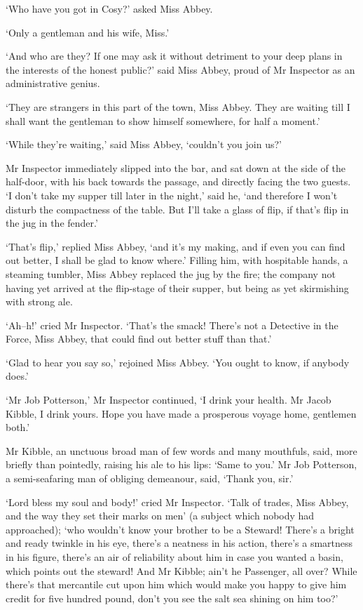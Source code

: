 ‘Who have you got in Cosy?’ asked Miss Abbey.

‘Only a gentleman and his wife, Miss.’

‘And who are they? If one may ask it without detriment to your deep
plans in the interests of the honest public?’ said Miss Abbey, proud of
Mr Inspector as an administrative genius.

‘They are strangers in this part of the town, Miss Abbey. They are
waiting till I shall want the gentleman to show himself somewhere, for
half a moment.’

‘While they’re waiting,’ said Miss Abbey, ‘couldn’t you join us?’

Mr Inspector immediately slipped into the bar, and sat down at the side
of the half-door, with his back towards the passage, and directly facing
the two guests. ‘I don’t take my supper till later in the night,’ said
he, ‘and therefore I won’t disturb the compactness of the table. But
I’ll take a glass of flip, if that’s flip in the jug in the fender.’

‘That’s flip,’ replied Miss Abbey, ‘and it’s my making, and if even you
can find out better, I shall be glad to know where.’ Filling him, with
hospitable hands, a steaming tumbler, Miss Abbey replaced the jug by
the fire; the company not having yet arrived at the flip-stage of their
supper, but being as yet skirmishing with strong ale.

‘Ah--h!’ cried Mr Inspector. ‘That’s the smack! There’s not a Detective
in the Force, Miss Abbey, that could find out better stuff than that.’

‘Glad to hear you say so,’ rejoined Miss Abbey. ‘You ought to know, if
anybody does.’

‘Mr Job Potterson,’ Mr Inspector continued, ‘I drink your health. Mr
Jacob Kibble, I drink yours. Hope you have made a prosperous voyage
home, gentlemen both.’

Mr Kibble, an unctuous broad man of few words and many mouthfuls, said,
more briefly than pointedly, raising his ale to his lips: ‘Same to you.’
Mr Job Potterson, a semi-seafaring man of obliging demeanour, said,
‘Thank you, sir.’

‘Lord bless my soul and body!’ cried Mr Inspector. ‘Talk of trades, Miss
Abbey, and the way they set their marks on men’ (a subject which nobody
had approached); ‘who wouldn’t know your brother to be a Steward!
There’s a bright and ready twinkle in his eye, there’s a neatness in his
action, there’s a smartness in his figure, there’s an air of reliability
about him in case you wanted a basin, which points out the steward! And
Mr Kibble; ain’t he Passenger, all over? While there’s that mercantile
cut upon him which would make you happy to give him credit for five
hundred pound, don’t you see the salt sea shining on him too?’


